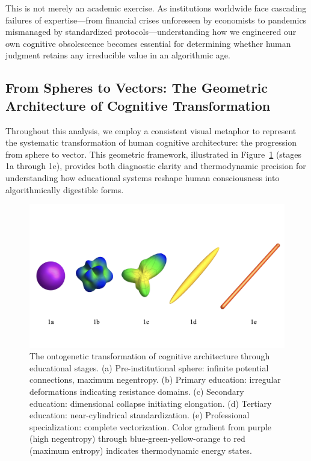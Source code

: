 This is not merely an academic exercise. As institutions worldwide face cascading failures of expertise---from financial crises unforeseen by economists to pandemics mismanaged by standardized protocols---understanding how we engineered our own cognitive obsolescence becomes essential for determining whether human judgment retains any irreducible value in an algorithmic age.

\subsection{From Spheres to Vectors: The Geometric Architecture of Cognitive Transformation}

Throughout this analysis, we employ a consistent visual metaphor to represent the systematic transformation of human cognitive architecture: the progression from sphere to vector. This geometric framework, illustrated in Figure~\ref{fig:sphere-to-vector} (stages 1a through 1e), provides both diagnostic clarity and thermodynamic precision for understanding how educational systems reshape human consciousness into algorithmically digestible forms.

\begin{figure}[ht]
\centering
\includegraphics[width=\textwidth]{../figures/sphere-to-vector.png}
\caption{The ontogenetic transformation of cognitive architecture through educational stages. (a) Pre-institutional sphere: infinite potential connections, maximum negentropy. (b) Primary education: irregular deformations indicating resistance domains. (c) Secondary education: dimensional collapse initiating elongation. (d) Tertiary education: near-cylindrical standardization. (e) Professional specialization: complete vectorization. Color gradient from purple (high negentropy) through blue-green-yellow-orange to red (maximum entropy) indicates thermodynamic energy states.}
\label{fig:sphere-to-vector}
\end{figure}

